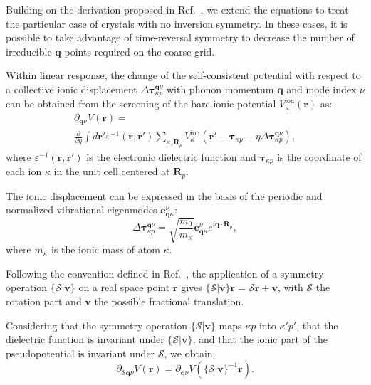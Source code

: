 \documentclass[final,3p,times,twocolumn]{elsarticle}
\begin{document}
Building on the derivation proposed in Ref.~\cite{Giustino2007}, we extend the equations to treat the particular case of crystals with no inversion symmetry. In these cases, it is possible to take advantage of time-reversal symmetry to decrease the number of irreducible $\mathbf{q}$-points required on the coarse grid. 

Within linear response, the change of the self-consistent potential with respect to a collective ionic displacement $\Delta\boldsymbol{\tau}_{\kappa p}^{\mathbf{q}\nu}$ with phonon momentum $\mathbf{q}$ and mode index $\nu$ can be obtained from the screening of the bare ionic potential $V^{\text{ion}}_\kappa(\mathbf{r})$ as:
\begin{multline}
\partial_{\mathbf{q}\nu} V(\mathbf{r}) = \\
 \frac{\partial}{\partial \eta}  \int d\mathbf{r}' \varepsilon^{-1}(\mathbf{r},\mathbf{r'}) \sum_{\kappa,\mathbf{R}_p} V^{\text{ion}}_\kappa(\mathbf{r}'-\boldsymbol{\tau}_{\kappa p}-\eta \Delta \boldsymbol{\tau}_{\kappa p}^{\mathbf{q}\nu}),
\end{multline}
where $\varepsilon^{-1}(\mathbf{r},\mathbf{r'})$ is the electronic dielectric function and $\boldsymbol{\tau}_{\kappa p}$ is the coordinate of each ion $\kappa$ in the unit cell centered at $\mathbf{R}_p$.

The ionic displacement can be expressed in the basis of the periodic and normalized vibrational eigenmodes $\mathbf{e}_{\mathbf{q}\kappa}^\nu$:
\begin{equation}\label{iondispl}
\Delta \boldsymbol{\tau}_{\kappa p}^{\mathbf{q}\nu} =  \sqrt{\frac{m_0}{m_\kappa}}\mathbf{e}_{\mathbf{q}\kappa}^\nu e^{i\mathbf{q}\cdot \mathbf{R}_p}, 
\end{equation}
where $m_\kappa$ is the ionic mass of atom $\kappa$.

Following the convention defined in Ref.~\cite{MARADUDIN1968}, the application of a symmetry operation $\{\mathcal{S}|\mathbf{v}\}$ on a real space point $\mathbf{r}$ gives $\{\mathcal{S}|\mathbf{v}\}\mathbf{r} = \mathcal{S}\mathbf{r} + \mathbf{v}$, with $\mathcal{S}$ the rotation part and $\mathbf{v}$ the possible fractional translation. 

Considering that the symmetry operation $\{\mathcal{S}|\mathbf{v}\}$ maps $\kappa p$ into $\kappa' p'$, that the dielectric function is invariant under $\{\mathcal{S}|\mathbf{v}\}$, and that the ionic part of the pseudopotential is invariant under $\mathcal{S}$, we obtain:  
\begin{equation}
\partial_{\mathcal{S}\mathbf{q}\nu} V(\mathbf{r}) = \partial_{\mathbf{q}\nu} V(\{\mathcal{S}|\mathbf{v}\}^{-1}\mathbf{r}).
\end{equation}
\end{document}
